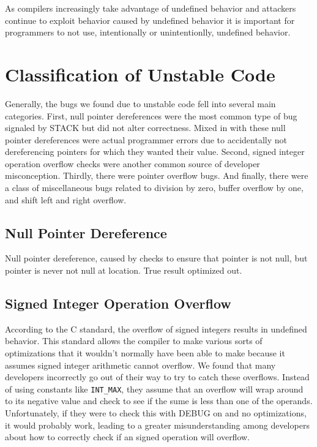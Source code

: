 \documentclass[9pt,twocolumn]{article}
\begin{document}
As compilers increasingly take advantage of undefined behavior \cite{stack} and
attackers continue to exploit behavior caused by undefined behavior it is
important for programmers to not use, intentionally or unintentionlly,
undefined behavior.

\section{Classification of Unstable Code}
\label{sec:classification}
Generally, the bugs we found due to unstable code fell into several
main categories. First, null pointer dereferences were the  most common type of 
bug signaled by STACK but did not alter correctness. Mixed in with these null pointer dereferences
were actual programmer errors due to accidentally not dereferencing pointers for which
they wanted their value. Second, signed integer operation overflow checks were another common source
of developer misconception. Thirdly, there were pointer overflow bugs. And finally, there were a class
of miscellaneous bugs related to division by zero, buffer overflow by one, and shift left and right overflow.


\subsection{Null Pointer Dereference}
Null pointer dereference, caused by checks to ensure that pointer is not null,
but pointer is never not null at location. True result optimized out.

\subsection{Signed Integer Operation Overflow}
According to the C standard, the overflow of signed integers results in undefined behavior. This standard allows the compiler to make various sorts of optimizations that it wouldn't normally have been able to make because it assumes signed integer arithmetic cannot overflow. We found that many developers incorrectly go out of their way to try to catch these overflows. Instead of using constants like \texttt{INT\_MAX}, they assume that an overflow will wrap around to its negative value and check to see if the sume is less than one of the operands. Unfortunately, if they were to check this with DEBUG on and no optimizations, it would probably work, leading to a greater misunderstanding among developers about how to correctly check if an signed operation will overflow.
\end{document}
